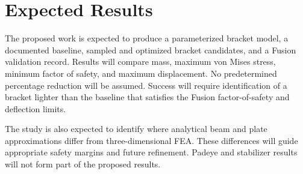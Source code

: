 \chapter{Expected Results}

The proposed work is expected to produce a parameterized bracket model, a documented baseline, sampled and optimized bracket candidates, and a Fusion validation record. Results will compare mass, maximum von Mises stress, minimum factor of safety, and maximum displacement. No predetermined percentage reduction will be assumed. Success will require identification of a bracket lighter than the baseline that satisfies the Fusion factor-of-safety and deflection limits.

The study is also expected to identify where analytical beam and plate approximations differ from three-dimensional FEA. These differences will guide appropriate safety margins and future refinement. Padeye and stabilizer results will not form part of the proposed results.
